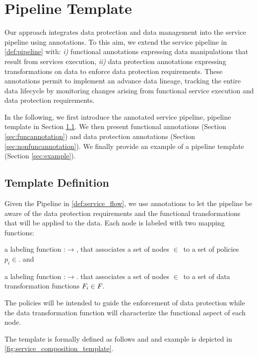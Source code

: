 \section{Pipeline Template}
Our approach integrates data protection and data management into the service pipeline using annotations.
To this aim, we extend the service pipeline in \cref{def:pipeline} with: \emph{i)} functional annotations expressing data manipulations that result from services execution, \emph{ii)} data protection annotations expressing transformations on data to enforce data protection requirements.
These annotations permit to implement an advance data lineage, tracking the entire data lifecycle by monitoring changes arising from functional service execution and data protection requirements.

In the following, we first introduce the annotated service pipeline, pipeline template in Section \ref{sec:templatedefinition}. We then present functional annotations (Section \ref{sec:funcannotation}) and data protection annotations (Section \ref{sec:nonfuncannotation}). We finally provide an example of a pipeline template (Section \ref{sec:example}).


\subsection{Template Definition}\label{sec:templatedefinition}

Given the Pipeline in \cref{def:service_flow}, we use annotations to let the pipeline be aware of the data protection requirements and the functional transformations that will be applied to the data.
Each node is labeled with two mapping functions:
\begin{enumerate*}[label=\roman*)]
  \item a labeling function \myLambda:\V$\rightarrow$\Pset{}, that associates a set of nodes $\in$\V\ to a set of policies $p_i\in$\Pset{}. and
  \item a labeling function \myGamma:\V$\rightarrow$\F{}. that associates a set of nodes $\in$\V\ to a set of data transformation functions $F_i\in F_{}$.

\end{enumerate*}
The policies will be intended to guide the enforcement of data protection while the data transformation function will characterize the functional aspect of each node.

The template is formally defined as follows and and example is depicted in \cref{fig:service_composition_template}.

